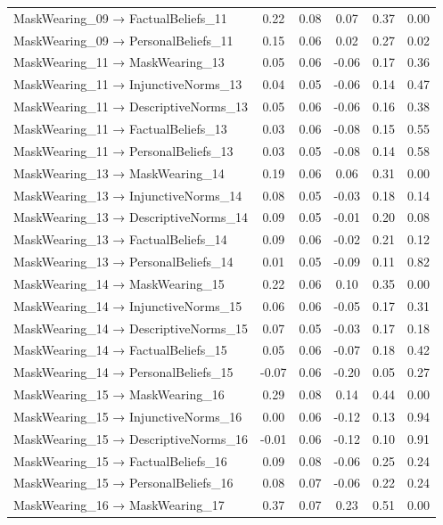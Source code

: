 \documentclass[
  man, donotrepeattitle,floatsintext]{apa6}
\begin{document}
\begin{center}
\begin{ThreePartTable}
{\begin{longtable}{lccccc}
MaskWearing\_09 → FactualBeliefs\_11 & 0.22 & 0.08 & 0.07 & 0.37 & 0.00\\
MaskWearing\_09 → PersonalBeliefs\_11 & 0.15 & 0.06 & 0.02 & 0.27 & 0.02\\
MaskWearing\_11 → MaskWearing\_13 & 0.05 & 0.06 & -0.06 & 0.17 & 0.36\\
MaskWearing\_11 → InjunctiveNorms\_13 & 0.04 & 0.05 & -0.06 & 0.14 & 0.47\\
MaskWearing\_11 → DescriptiveNorms\_13 & 0.05 & 0.06 & -0.06 & 0.16 & 0.38\\
MaskWearing\_11 → FactualBeliefs\_13 & 0.03 & 0.06 & -0.08 & 0.15 & 0.55\\
MaskWearing\_11 → PersonalBeliefs\_13 & 0.03 & 0.05 & -0.08 & 0.14 & 0.58\\
MaskWearing\_13 → MaskWearing\_14 & 0.19 & 0.06 & 0.06 & 0.31 & 0.00\\
MaskWearing\_13 → InjunctiveNorms\_14 & 0.08 & 0.05 & -0.03 & 0.18 & 0.14\\
MaskWearing\_13 → DescriptiveNorms\_14 & 0.09 & 0.05 & -0.01 & 0.20 & 0.08\\
MaskWearing\_13 → FactualBeliefs\_14 & 0.09 & 0.06 & -0.02 & 0.21 & 0.12\\
MaskWearing\_13 → PersonalBeliefs\_14 & 0.01 & 0.05 & -0.09 & 0.11 & 0.82\\
MaskWearing\_14 → MaskWearing\_15 & 0.22 & 0.06 & 0.10 & 0.35 & 0.00\\
MaskWearing\_14 → InjunctiveNorms\_15 & 0.06 & 0.06 & -0.05 & 0.17 & 0.31\\
MaskWearing\_14 → DescriptiveNorms\_15 & 0.07 & 0.05 & -0.03 & 0.17 & 0.18\\
MaskWearing\_14 → FactualBeliefs\_15 & 0.05 & 0.06 & -0.07 & 0.18 & 0.42\\
MaskWearing\_14 → PersonalBeliefs\_15 & -0.07 & 0.06 & -0.20 & 0.05 & 0.27\\
MaskWearing\_15 → MaskWearing\_16 & 0.29 & 0.08 & 0.14 & 0.44 & 0.00\\
MaskWearing\_15 → InjunctiveNorms\_16 & 0.00 & 0.06 & -0.12 & 0.13 & 0.94\\
MaskWearing\_15 → DescriptiveNorms\_16 & -0.01 & 0.06 & -0.12 & 0.10 & 0.91\\
MaskWearing\_15 → FactualBeliefs\_16 & 0.09 & 0.08 & -0.06 & 0.25 & 0.24\\
MaskWearing\_15 → PersonalBeliefs\_16 & 0.08 & 0.07 & -0.06 & 0.22 & 0.24\\
MaskWearing\_16 → MaskWearing\_17 & 0.37 & 0.07 & 0.23 & 0.51 & 0.00\\

\end{longtable}}
\end{ThreePartTable}
\end{center}
\end{document}
